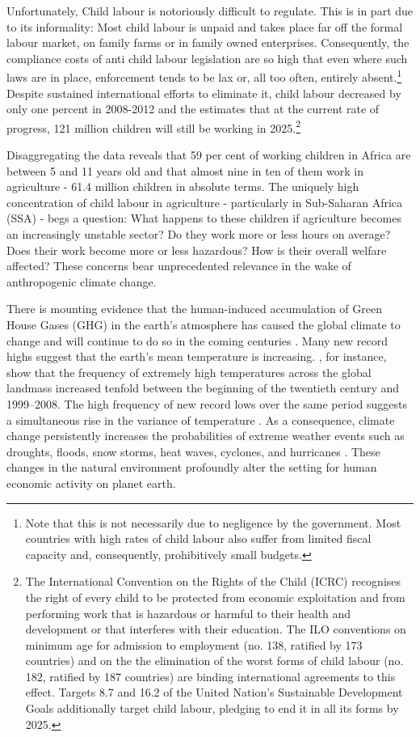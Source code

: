 \documentclass[a4paper,12pt]{article}
\theoremstyle{plain}
\theoremstyle{definition}
\theoremstyle{definition}
\theoremstyle{definition}
\theoremstyle{definition}
\begin{document}
Unfortunately, Child labour is notoriously difficult to regulate. This is in part due to its informality: Most child labour is unpaid and takes place far off the formal labour market, on family farms or in family owned enterprises. Consequently, the compliance costs of anti child labour legislation are so high that even where such laws are in place, enforcement tends to be lax or, all too often, entirely absent.\footnote{Note that this is not necessarily due to negligence by the government. Most countries with high rates of child labour also suffer from limited fiscal capacity and, consequently, prohibitively small budgets.} Despite sustained international efforts to eliminate it, child labour decreased by only one percent in 2008-2012 and the \citet{ILO2017} estimates that at the current rate of progress, 121 million children will still be working in 2025.\footnote{The International Convention on the Rights of the Child (ICRC) recognises the right of every child to be protected from economic exploitation and from performing work that is hazardous or harmful to their health and development or that interferes with their education. The ILO conventions on minimum age for admission to employment (no. 138, ratified by 173 countries) and on the the elimination of the worst forms of child labour (no. 182, ratified by 187 countries) are binding international agreements to this effect. Targets 8.7 and 16.2 of the United Nation's Sustainable Development Goals additionally target child labour, pledging to end it in all its forms by 2025.}

Disaggregating the data reveals that 59 per cent of working children in Africa are between 5 and 11 years old and that almost nine in ten of them work in agriculture - 61.4 million children in absolute terms. The uniquely high concentration of child labour in agriculture - particularly in Sub-Saharan Africa (SSA) - begs a question: What happens to these children if agriculture becomes an increasingly unstable sector? Do they work more or less hours on average? Does their work become more or less hazardous? How is their overall welfare affected? These concerns bear unprecedented relevance in the wake of anthropogenic climate change.

There is mounting evidence that the human-induced accumulation of Green House Gases (GHG) in the earth's atmosphere has caused the global climate to change and will continue to do so in the coming centuries \citep{Pachauri2014}. Many new record highs suggest that the earth's mean temperature is increasing. \citet{Munasinghe2012}, for instance, show that the frequency of extremely high temperatures across the global landmass increased tenfold between the beginning of the twentieth century and 1999–2008. The high frequency of new record lows over the same period suggests a simultaneous rise in the variance of temperature \citep{Auffhammer2014a}. As a consequence, climate change persistently increases the probabilities of extreme weather events such as droughts, floods, snow storms, heat waves, cyclones, and hurricanes \citep{Pachauri2014}. These changes in the natural environment profoundly alter the setting for human economic activity on planet earth.
\end{document}
